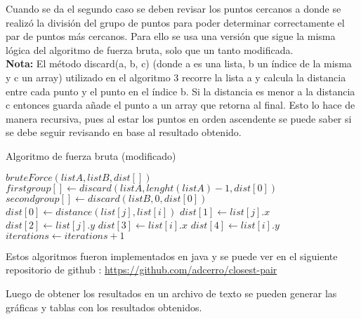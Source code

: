 Cuando se da el segundo caso se deben revisar los puntos cercanos a donde se realizó la división del grupo de puntos para poder determinar correctamente el par de puntos más cercanos. Para ello se usa una versión que sigue la misma lógica del algoritmo de fuerza bruta, solo que un tanto modificada.\\

\textbf{Nota: } El método discard(a, b, c) (donde a es una lista, b un índice de la misma y c un array) utilizado en el algoritmo 3 recorre la lista a y calcula la distancia entre cada punto y el punto en el índice b. Si la distancia es menor a la distancia c entonces guarda añade el punto a un array que retorna al final.
Esto lo hace de manera recursiva, pues al estar los puntos en orden ascendente se puede saber si se debe seguir revisando en base al resultado obtenido.\\

\begin{algorithm}[h!]
\caption{Algoritmo de fuerza bruta (modificado)}
\begin{algorithmic}
\State $bruteForce(listA, listB, dist[])$
    \State $firstgroup[] \gets discard(listA,lenght(listA)-1,dist[0])$
    \State $secondgroup[] \gets discard(listB,0,dist[0])$
            \State $dist[0] \gets distance(list[j], list[i])$
            \State $ dist[1] \gets list[j].x$
            \State $ dist[2] \gets list[j].y$
            \State $ dist[3] \gets list[i].x$
            \State $ dist[4] \gets list[i].y$
        \EndIf
        \EndFor
        \State $ iterations \gets iterations + 1$
    \EndFor
\end{algorithmic}    
\end{algorithm}
\FloatBarrier
Estos algoritmos fueron implementados en java y se puede ver en el siguiente repositorio de github : \url{https://github.com/adcerro/closest-pair}

Luego de obtener los resultados en un archivo de texto se pueden generar las gráficas y tablas con los resultados obtenidos.